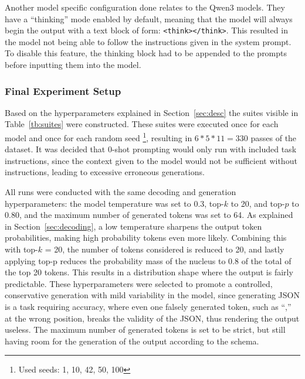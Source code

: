\documentclass[english, 12pt, a4paper, sci, utf8, a-2b, online]{latex/definitions/aaltothesis}
\begin{document}
Another model specific configuration done relates to the Qwen3 models. They have a ``thinking'' mode enabled by default, meaning that the model will always begin the output with a text block of form: \texttt{<think></think>}. This resulted in the model not being able to follow the instructions given in the system prompt. To disable this feature, the thinking block had to be appended to the prompts before inputting them into the model.

\begin{table}[h]
    \centering
    \scriptsize
    
    \caption{The final suite of run hyperparameters}
    \label{tb:suites}
\end{table}

\subsubsection{Final Experiment Setup}

Based on the hyperparameters explained in Section~\ref{sec:desc} the suites visible in Table~\ref{tb:suites} were constructed. These suites were executed once for each model and once for each random seed \footnote{Used seeds: 1, 10, 42, 50, 100}, resulting in $6 * 5 * 11 = 330$ passes of the dataset. It was decided that 0-shot prompting would only run with included task instructions, since the context given to the model would not be sufficient without instructions, leading to excessive erroneous generations.

All runs were conducted with the same decoding and generation hyperparameters: the model temperature was set to 0.3, top-$k$ to 20, and top-$p$ to 0.80, and the maximum number of generated tokens was set to 64. As explained in Section~\ref{sec:decoding}, a low temperature sharpens the output token probabilities, making high probability tokens even more likely. Combining this with top-$k$ = 20, the number of tokens considered is reduced to 20, and lastly applying top-p reduces the probability mass of the nucleus to 0.8 of the total of the top 20 tokens. This results in a distribution shape where the output is fairly predictable. These hyperparameters were selected to promote a controlled, conservative generation with mild variability in the model, since generating JSON is a task requiring accuracy, where even one falsely generated token, such as ``,'' at the wrong position, breaks the validity of the JSON, thus rendering the output useless. The maximum number of generated tokens is set to be strict, but still having room for the generation of the output according to the schema.
\end{document}
